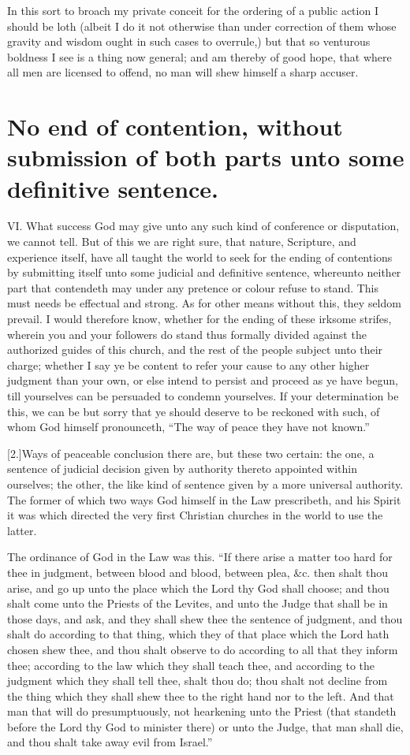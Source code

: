 In this sort to broach my private conceit for the ordering of a public action I should be loth (albeit I do it not otherwise than under correction of them whose gravity and wisdom ought in such cases to overrule,) but that so venturous boldness I see is a thing now general; and am thereby of good hope, that where all men are licensed to offend, no man will shew himself a sharp accuser.

\section*{No end of contention, without submission of both parts unto some definitive sentence.}

VI. What success God may give unto any such kind of conference or disputation, we cannot tell. But of this we are right sure, that nature, Scripture, and experience itself, have all taught the world to seek for the ending of contentions by submitting itself unto some judicial and definitive sentence, whereunto neither part that contendeth may under any pretence or colour refuse to stand. This must needs be effectual and strong. As for other means without this, they seldom prevail. I would therefore know, whether for the ending of these irksome strifes, wherein you and your followers do stand thus formally divided against the authorized guides of this church, and the rest of the people subject unto their charge; whether I say ye be content to refer your cause to any other higher judgment than your own, or else intend to persist and proceed as ye have begun, till yourselves can be persuaded to condemn yourselves. If your determination be this, we can be but sorry that ye should deserve to be reckoned with such, of whom God himself pronounceth, “The way of peace they have not known.”

[2.]Ways of peaceable conclusion there are, but these two certain: the one, a sentence of judicial decision given by authority thereto appointed within ourselves; the other, the like kind of sentence given by a more universal authority. The former of which two ways God himself in the Law  prescribeth, and his Spirit it was which directed the very first Christian churches in the world to use the latter.

The ordinance of God in the Law was this. “If there arise a matter too hard for thee in judgment, between blood and blood, between plea, \&c. then shalt thou arise, and go up unto the place which the Lord thy God shall choose; and thou shalt come unto the Priests of the Levites, and unto the Judge that shall be in those days, and ask, and they shall shew thee the sentence of judgment, and thou shalt do according to that thing, which they of that place which the Lord hath chosen shew thee, and thou shalt observe to do according to all that they inform thee; according to the law which they shall teach thee, and according to the judgment which they shall tell thee, shalt thou do; thou shalt not decline from the thing which they shall shew thee to the right hand nor to the left. And that man that will do presumptuously, not hearkening unto the Priest (that standeth before the Lord thy God to minister there) or unto the Judge, that man shall die, and thou shalt take away evil from Israel.”


